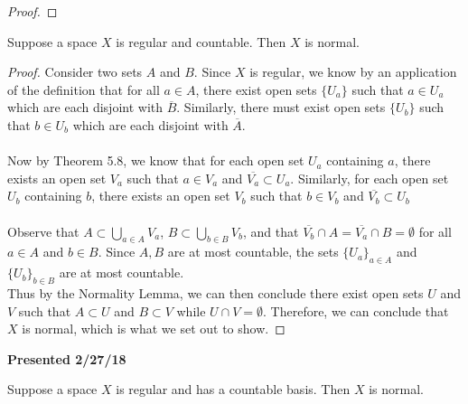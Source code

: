 \documentclass[a4paper,12pt,twoside]{hmcpset}
\begin{document}
\begin{proof}
    
\end{proof}

\begin{problem}[Theorem 5.31] Suppose a space $X$ is regular and
    countable. Then $X$ is normal.
\end{problem}

\begin{proof}
    Consider two sets $A$ and $B$. Since $X$ is regular, we know by an
    application of the definition that for all $a \in A$, there exist
    open sets $\{U_a\}$ such that $a \in U_a$ which are each disjoint
    with $\overline{B}$. Similarly, there must exist open sets
    $\{U_b\}$ such that $b \in U_b$ which are each disjoint with
    $\overline{A}$. \\
    \\
    Now by Theorem 5.8, we know that for each open set $U_a$
    containing $a$, there exists an open set $V_a$ such that $a \in
    V_a$ and $\overline{V_a} \subset U_a$. Similarly, for each open
    set $U_b$ containing $b$, there exists an open set $V_b$ such that
    $b \in V_b$ and $\overline{V_b} \subset U_b$ \\
    \\
    Observe that $A \subset \bigcup\limits_{a \in A}V_a$, $B \subset
    \bigcup\limits_{b \in
    B}V_b$, and that $\overline{V_b} \cap A = \overline{V_a} \cap B =
    \emptyset$ for all $a \in A$ and $b \in B$. Since $A, B$ are at
    most countable, the sets $\{U_a\}_{a \in A}$ and $\{U_b\}_{b \in
    B}$ are at most countable. 
    \\
    Thus by the Normality
    Lemma, we can then conclude there exist open sets $U$ and $V$ such
    that $A \subset U$ and $B \subset V$ while $U \cap V = \emptyset$.
    Therefore, we can conclude that $X$ is normal, which is what we
    set out to show.
\end{proof}

\noindent
\textbf{Presented 2/27/18}\\
\begin{problem}[Theorem 5.32] Suppose a space $X$ is regular and has a
    countable basis. Then $X$ is normal.
\end{problem}
\end{document}
